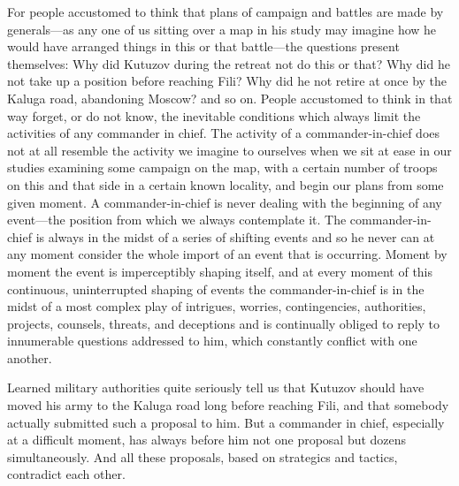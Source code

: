 For people accustomed to think that plans of campaign and battles
are made by generals---as any one of us sitting over a map in his
study may imagine how he would have arranged things in this or
that battle---the questions present themselves: Why did Kutuzov
during the retreat not do this or that? Why did he not take up a
position before reaching Fili?  Why did he not retire at once by
the Kaluga road, abandoning Moscow? and so on. People accustomed
to think in that way forget, or do not know, the inevitable
conditions which always limit the activities of any commander in
chief. The activity of a commander-in-chief does not at all
resemble the activity we imagine to ourselves when we sit at ease
in our studies examining some campaign on the map, with a certain
number of troops on this and that side in a certain known
locality, and begin our plans from some given moment. A
commander-in-chief is never dealing with the beginning of any
event---the position from which we always contemplate it. The
commander-in-chief is always in the midst of a series of shifting
events and so he never can at any moment consider the whole
import of an event that is occurring. Moment by moment the event
is imperceptibly shaping itself, and at every moment of this
continuous, uninterrupted shaping of events the
commander-in-chief is in the midst of a most complex play of
intrigues, worries, contingencies, authorities, projects,
counsels, threats, and deceptions and is continually obliged to
reply to innumerable questions addressed to him, which constantly
conflict with one another.

Learned military authorities quite seriously tell us that Kutuzov
should have moved his army to the Kaluga road long before
reaching Fili, and that somebody actually submitted such a
proposal to him. But a commander in chief, especially at a
difficult moment, has always before him not one proposal but
dozens simultaneously. And all these proposals, based on
strategics and tactics, contradict each other.

